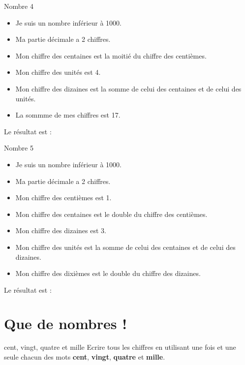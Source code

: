 \documentclass{beamer}
\begin{document}
\begin{frame}
  \begin{block}{Nombre 4}
      \begin{itemize}
            \item Je suis un nombre inférieur à 1000.
            \item Ma partie décimale a 2 chiffres.
            \item Mon chiffre des centaines est la moitié du chiffre des centièmes. 
            \item Mon chiffre des unités est 4.
            \item Mon chiffre des dizaines est la somme de celui des centaines et de celui des unités.
            \item La sommme de mes chiffres est 17. 
      \end{itemize}
      Le résultat est : 
  \end{block} 
\end{frame}

\begin{frame}
  \begin{block}{Nombre 5}
      \begin{itemize}
            \item Je suis un nombre inférieur à 1000.
            \item Ma partie décimale a 2 chiffres.
            \item Mon chiffre des centièmes est 1.
            \item Mon chiffre des centaines est le double du chiffre des centièmes. 
            \item Mon chiffre des dizaines est 3.
            \item Mon chiffre des unités est la somme de celui des centaines et de celui des dizaines.
            \item Mon chiffre des dixièmes est le double du chiffre des dizaines. 
      \end{itemize}
      Le résultat est : 
  \end{block} 
\end{frame}


\section{Que de nombres !}

\frame{\tableofcontents[sectionstyle=show/shaded]}

\begin{frame}
  \begin{block}{cent, vingt, quatre et mille}
 Ecrire tous les chiffres en utilisant \alert{une fois et une seule} chacun des mots \textbf{cent}, \textbf{vingt}, \textbf{quatre} et \textbf{mille}.
  \end{block} 
\end{frame}
\end{document}
